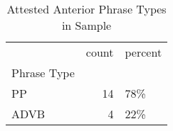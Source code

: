 \begin{table}[htbp!]
\centering
\caption{Attested Anterior Phrase Types in Sample}
\label{table:ant_phtype_ct}
\begin{tabular}{lrl}
\toprule
{} &  count & percent \\
Phrase Type &        &         \\
\midrule
PP          &     14 &     78\% \\
ADVB        &      4 &     22\% \\
\bottomrule
\end{tabular}
\end{table}
